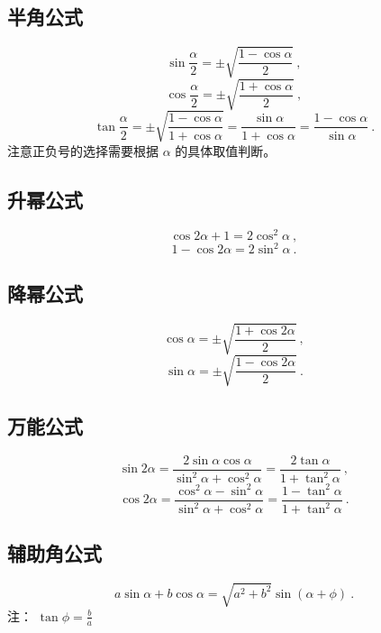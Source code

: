 \subsection{半角公式}
\begin{equation}
\sin\frac{\alpha}{2} = \pm\sqrt{\frac{1-\cos\alpha}{2}}~,
\end{equation}
\begin{equation}
\cos\frac{\alpha}{2}= \pm\sqrt{\frac{1+\cos\alpha}{2}}~,
\end{equation}
\begin{equation}
\tan\frac{\alpha}{2} = \pm\sqrt{\frac{1-\cos\alpha}{1+\cos\alpha}} = \frac{\sin\alpha}{1+\cos\alpha} = \frac{1-\cos\alpha}{\sin\alpha}~.
\end{equation}
注意正负号的选择需要根据 $\alpha$ 的具体取值判断。

\subsection{升幂公式}
\begin{equation}
\cos2\alpha + 1 = 2\cos^2\alpha~,
\end{equation}
\begin{equation}
1-\cos2\alpha = 2\sin^2\alpha~.
\end{equation}

\subsection{降幂公式}
\begin{equation}
\cos\alpha = \pm\sqrt{\frac{1+\cos2\alpha}{2}}~,
\end{equation}
\begin{equation}
\sin\alpha = \pm\sqrt{\frac{1-\cos2\alpha}{2}}~.
\end{equation}

\subsection{万能公式}
\begin{equation}
\sin2\alpha = \frac{2\sin\alpha \cos\alpha}{\sin^2\alpha + \cos^2\alpha} = \frac{2\tan\alpha}{1+\tan^2\alpha}~,
\end{equation}
\begin{equation}
\cos2\alpha = \frac{\cos^2\alpha-\sin^2\alpha}{\sin^2\alpha+\cos^2\alpha} = \frac{1-\tan^2\alpha}{1+\tan^2\alpha}~.
\end{equation}

\subsection{辅助角公式}
\begin{equation}
a\sin\alpha + b\cos\alpha = \sqrt{a^2+b^2}\sin(\alpha + \phi)~.
\end{equation}
注： $\tan\phi = \frac{b}{a}$


